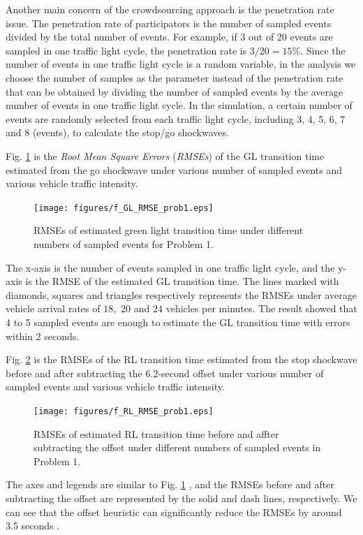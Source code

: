 \documentclass[final,oneside,onecolumn,12pt,a4paper]{book}%
\begin{document}
Another main concern of the crowdsourcing approach is the penetration rate
issue. The penetration rate of participators is the number of sampled events
divided by the total number of events. For example, if 3 out of 20 events are
sampled in one traffic light cycle, the penetration rate is $3/20=15\%$. Since
the number of events in one traffic light cycle is a random variable, in the
analysis we choose the number of samples as the parameter instead of the
penetration rate that can be obtained by dividing the number of sampled events
by the average number of events in one traffic light cycle. In the simulation,
a certain number of events are randomly selected from each traffic light
cycle, including 3, 4, 5, 6, 7 and 8 (events), to calculate the stop/go shockwaves.

Fig. \ref{fig:f_GL_RMSE_prob1} is the \emph{Root Mean Square Errors}
(\emph{RMSEs}) of the GL transition time estimated from the go shockwave under
various number of sampled events and various vehicle traffic intensity.
\begin{figure}[th]
\centerline{\texttt{[image: figures/f\_GL\_RMSE\_prob1.eps]}} \hfill\caption{RMSEs of estimated green light
transition time under different numbers of sampled events for Problem 1.}%
\label{fig:f_GL_RMSE_prob1}%
\end{figure}The x-axis is the number of events sampled in one traffic light
cycle, and the y-axis is the RMSE of the estimated GL transition time. The
lines marked with diamonds, squares and triangles respectively represents the
RMSEs under average vehicle arrival rates of $18,$ $20$ and $24$ vehicles per
minutes. The result showed that 4 to 5 sampled events are enough to estimate
the GL transition time with errors within $2$ seconds.

Fig. \ref{fig:f_RL_RMSE_prob1} is the RMSEs of the RL transition time
estimated from the stop shockwave before and after subtracting the
$6.2$-second offset under various number of sampled events and various vehicle
traffic intensity. \begin{figure}[th]
\centerline{\texttt{[image: figures/f\_RL\_RMSE\_prob1.eps]}} \hfill\caption{RMSEs of estimated RL transition
time before and affter subtracting the offset under different numbers of
sampled events in Problem 1.}%
\label{fig:f_RL_RMSE_prob1}%
\end{figure}The axes and legends are similar to Fig. \ref{fig:f_GL_RMSE_prob1}%
, and the RMSEs before and after subtracting the offset are represented by the
solid and dash lines, respectively. We can see that the offset heuristic can
significantly reduce the RMSEs by around 3.5 seconds .
\end{document}
